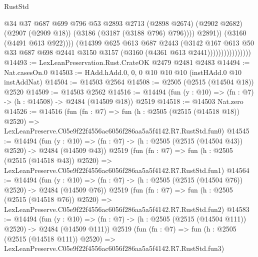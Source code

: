 \begin{lexlean}{RustStd}
\begin{coremodule}
                                        @34
                                        @37
                                        @687
                                        @699
                                        @796
                                        @53
                                        @2893
                                        @2713
                                        (@2898 @2674)
                                        (@2902 @2682)
                                        (@2907 (@2909 @18))
                                        (@3186 (@3187 (@3188 @796) @796))))
                                    @2891))
                                (@3160 (@4491 @613 @922))))
                            (@14399
                              @625
                              @613
                              @687
                              @2443
                              (@3142
                                @167
                                @613
                                @50
                                @33
                                @687
                                @698
                                @2441
                                @3150
                                @3157
                                (@3160 (@4361 @613 @2441))))))))))))))))
@14493 := LexLeanPreservation.Rust.CrateOK @2479 @2481 @2483
@14494 := Nat.casesOn.{0}
@14503 := HAdd.hAdd.{0, 0, 0} @10 @10 @10 (instHAdd.{0} @10 instAddNat)
@14504 := @14503 @2564
@14508 := @2505 (@2515 (@14504 @18)) @2520
@14509 := @14503 @2562
@14516 := @14494 (fun (y : @10) => (fn : @7) -> (h : @14508) -> @2484 (@14509 @18)) @2519
@14518 := @14503 Nat.zero
@14526 := @14516
    (fun (fn : @7) =>
    fun (h : @2505 (@2515 (@14518 @18)) @2520) =>
    LexLeanPreserve.C05e9f22f4556ac6056f286aa5a5f4142.R7.RustStd.fun0)
@14545 := @14494
    (fun (y : @10) => (fn : @7) -> (h : @2505 (@2515 (@14504 @43)) @2520) -> @2484 (@14509 @43))
    @2519
    (fun (fn : @7) =>
    fun (h : @2505 (@2515 (@14518 @43)) @2520) =>
    LexLeanPreserve.C05e9f22f4556ac6056f286aa5a5f4142.R7.RustStd.fun1)
@14564 := @14494
    (fun (y : @10) => (fn : @7) -> (h : @2505 (@2515 (@14504 @76)) @2520) -> @2484 (@14509 @76))
    @2519
    (fun (fn : @7) =>
    fun (h : @2505 (@2515 (@14518 @76)) @2520) =>
    LexLeanPreserve.C05e9f22f4556ac6056f286aa5a5f4142.R7.RustStd.fun2)
@14583 := @14494
    (fun (y : @10) => (fn : @7) -> (h : @2505 (@2515 (@14504 @111)) @2520) -> @2484 (@14509 @111))
    @2519
    (fun (fn : @7) =>
    fun (h : @2505 (@2515 (@14518 @111)) @2520) =>
    LexLeanPreserve.C05e9f22f4556ac6056f286aa5a5f4142.R7.RustStd.fun3)

\end{coremodule}
\end{lexlean}
